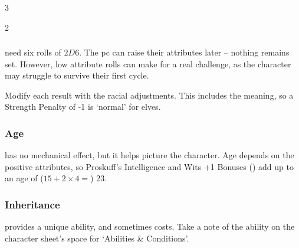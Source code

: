 \begin{multicols}{3}

%
\label{randomNames}%

\namesfordwarves

\namesforelves

\namesforgnolls

\namesforgnomes

\namesforhumans

\end{multicols}

\begin{multicols}{2}

\subsubsection{}
need six rolls of $2D6$.
The \gls{pc} can raise their \glspl{attribute} later -- nothing remains set.
However, low \gls{attribute} rolls can make for a real challenge, as the character may struggle to survive their first \gls{cycle}.

\label{randomAttributes}
\attributeChart

Modify each result with the racial adjustments.
This includes the meaning, so a Strength Penalty of -1 is `normal' for elves.

\subsubsection{Age}
has no mechanical effect, but it helps picture the character.
Age depends on the positive \glspl{attribute}, so Proskuff's Intelligence and Wits +1 Bonuses () add up to an age of ($15 + 2\times 4 =$) 23.

\raceAgeChart

\subsubsection{Inheritance}
\label{racialAbility}
provides a unique ability, and sometimes costs.
Take a note of the ability on the character sheet's space for `Abilities \& Conditions'.

\raceAbilitiesChart

\end{multicols}

\exampleRandomCharacter %

\pagestyle{plain}
\toggletrue{countedPage}

